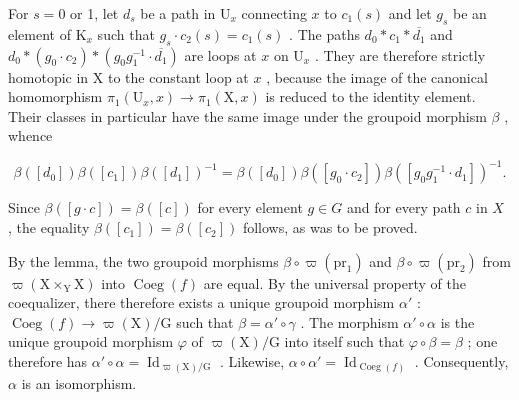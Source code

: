 For \(s=0\) or 1, let \(d_{s}\) be a path in \(\mathrm{U}_{x}\) connecting \(x\) to \(c_{1}(s)\) and let \(g_{s}\) be an element of \(\mathrm{K}_{x}\) such that \(g_{s}\cdot c_{2}(s)=c_{1}(s)\) . The paths \(d_{0}*c_{1}*\overline{d_{1}}\) and \(d_{0}*(g_{0}\cdot c_{2})*(g_{0}g_{1}^{-1}\cdot\overline{d_{1}})\) are loops at \(x\) on \(\mathrm{U}_{x}\) . They are therefore strictly homotopic in X to the constant loop at \(x\) , because the image of the canonical homomorphism \(\pi_{1}(\mathrm{U}_{x},x)\to\pi_{1}(\mathrm{X},x)\) is reduced to the identity element. Their classes in particular have the same image under the groupoid morphism \(\beta\) , whence

\[
\beta ([ d _ {0} ]) \beta ([ c _ {1} ]) \beta ([ d _ {1} ]) ^ {- 1} = \beta ([ d _ {0} ]) \beta ([ g _ {0} \cdot c _ {2} ]) \beta ([ g _ {0} g _ {1} ^ {- 1} \cdot d _ {1} ]) ^ {- 1}.
\]

Since \(\beta([g \cdot c]) = \beta([c])\) for every element \(g \in G\) and for every path \(c\) in \(X\) , the equality \(\beta([c_1]) = \beta([c_2])\) follows, as was to be proved.

By the lemma, the two groupoid morphisms \(\beta \circ \varpi(\mathrm{pr}_{1})\) and \(\beta \circ \varpi(\mathrm{pr}_{2})\) from \(\varpi(\mathrm{X} \times_{\mathrm{Y}} \mathrm{X})\) into \(\operatorname{Coeg}(f)\) are equal. By the universal property of the coequalizer, there therefore exists a unique groupoid morphism \(\alpha'\) : \(\operatorname{Coeg}(f) \to \varpi(\mathrm{X})/\mathrm{G}\) such that \(\beta = \alpha' \circ \gamma\) . The morphism \(\alpha' \circ \alpha\) is the unique groupoid morphism \(\varphi\) of \(\varpi(\mathrm{X})/\mathrm{G}\) into itself such that \(\varphi \circ \beta = \beta\) ; one therefore has \(\alpha' \circ \alpha = \operatorname{Id}_{\varpi(\mathrm{X})/\mathrm{G}}\) . Likewise, \(\alpha \circ \alpha' = \operatorname{Id}_{\operatorname{Coeg}(f)}\) . Consequently, \(\alpha\) is an isomorphism.

